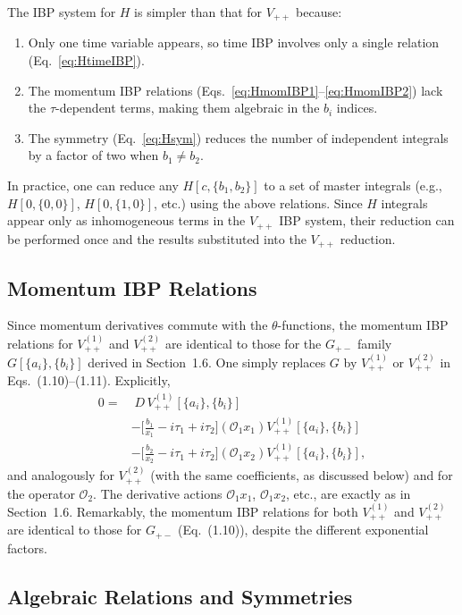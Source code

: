 \documentclass[a4paper,12pt]{article}
\begin{document}
The IBP system for $H$ is simpler than that for $V_{++}$ because:
\begin{enumerate}
	\item Only one time variable appears, so time IBP involves only a single relation (Eq.~\ref{eq:HtimeIBP}).
	\item The momentum IBP relations (Eqs.~\ref{eq:HmomIBP1}--\ref{eq:HmomIBP2}) lack the $\tau$-dependent terms, making them algebraic in the $b_i$ indices.
	\item The symmetry (Eq.~\ref{eq:Hsym}) reduces the number of independent integrals by a factor of two when $b_1\neq b_2$.
\end{enumerate}
In practice, one can reduce any $H[c,\{b_1,b_2\}]$ to a set of master integrals (e.g., $H[0,\{0,0\}]$, $H[0,\{1,0\}]$, etc.) using the above relations. Since $H$ integrals appear only as inhomogeneous terms in the $V_{++}$ IBP system, their reduction can be performed once and the results substituted into the $V_{++}$ reduction.
\subsection{Momentum IBP Relations}

Since momentum derivatives commute with the $\theta$-functions, the momentum IBP relations for $V_{++}^{(1)}$ and $V_{++}^{(2)}$ are identical to those for the $G_{+-}$ family $G[\{a_i\},\{b_i\}]$ derived in Section~1.6. One simply replaces $G$ by $V_{++}^{(1)}$ or $V_{++}^{(2)}$ in Eqs.~(1.10)--(1.11). Explicitly,
\begin{align}
	0 = & \; D\, V_{++}^{(1)}[\{a_i\},\{b_i\}] \nonumber        \\
	    & - \Big[ \frac{b_1}{x_1} - i\tau_1 + i\tau_2 \Big]
	(\mathcal{O}_1 x_1) V_{++}^{(1)}[\{a_i\},\{b_i\}] \nonumber \\
	    & - \Big[ \frac{b_2}{x_2} - i\tau_1 + i\tau_2 \Big]
	(\mathcal{O}_1 x_2) V_{++}^{(1)}[\{a_i\},\{b_i\}], \label{eq:Vpp1momIBP}
\end{align}
and analogously for $V_{++}^{(2)}$ (with the same coefficients, as discussed below) and for the operator $\mathcal{O}_2$. The derivative actions $\mathcal{O}_1 x_1$, $\mathcal{O}_1 x_2$, etc., are exactly as in Section~1.6. Remarkably, the momentum IBP relations for both $V_{++}^{(1)}$ and $V_{++}^{(2)}$ are identical to those for $G_{+-}$ (Eq.~(1.10)), despite the different exponential factors.

\subsection{Algebraic Relations and Symmetries}
\end{document}
